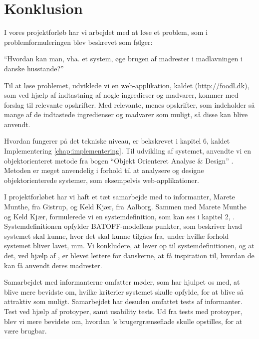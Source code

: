 \chapter{Konklusion}
\label{chap:konklusion}

I vores projektforløb har vi arbejdet med at løse et problem, som i problemformuleringen blev beskrevet som følger:

``Hvordan kan man, vha. et system, øge brugen af madrester i madlavningen i danske husstande?''

Til at løse problemet, udviklede vi en web-applikation, kaldet \Foodl{} (\url{http://foodl.dk}), som ved hjælp af indtastning af nogle ingredieser og
madvarer, kommer med forslag til relevante opskrifter. Med relevante, menes opskrifter, som indeholder så mange af de indtastede ingredienser
og madvarer som muligt, så disse kan blive anvendt.

Hvordan \Foodl{} fungerer på det tekniske niveau, er bekskrevet i kapitel 6, kaldet Implementering \ref{chap:implementering}. Til udvikling af systemet, anvendte vi en objektorienteret metode fra bogen ``Objekt Orienteret Analyse \& Design'' \cite{ooad}. Metoden er meget anvendelig i forhold til at analysere og designe objektorienterede systemer, som eksempelvis web-applikationer. 

I projektforløbet har vi haft et tæt samarbejde med to informanter, Marete Munthe, fra Gistrup, og Keld Kjær, fra Aalborg. Sammen med Marete Munthe og Keld Kjær, formulerede vi en systemdefinition, som kan ses i kapitel 2, . Systemdefinitionen opfylder BATOFF-modellens punkter, som beskriver hvad systemet skal kunne, hvor det skal kunne tilgåes fra, under hvilke forhold systemet bliver lavet, mm. Vi konkludere, at \Foodl{} lever op til systemdefinitionen, og at det, ved hjælp af \Foodl{}, er blevet lettere for danskerne, at få inspiration til, hvordan de kan få anvendt deres madrester.

Samarbejdet med informanterne omfatter møder, som har hjulpet os med, at blive mere bevidste om, hvilke kriterier systemet skulle opfylde, for at blive så attraktiv som muligt. Samarbejdet har desuden omfattet tests af informanter. Test ved hjælp af protoyper, samt usability tests. Ud fra tests med protoyper, blev vi mere bevidste om, hvordan \Foodl{}'s brugergrænseflade skulle opstilles, for at være brugbar. 


